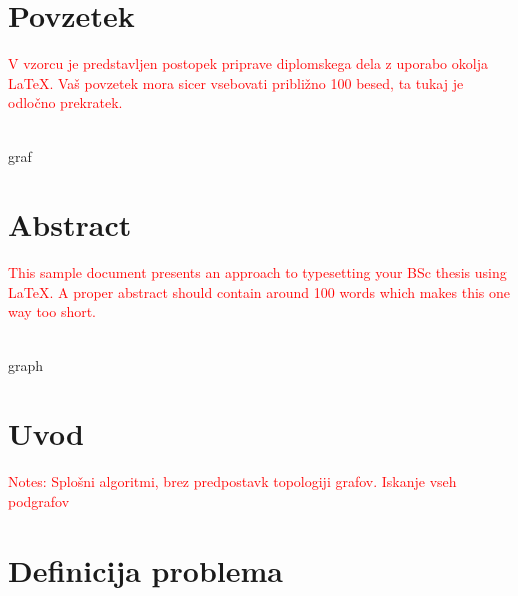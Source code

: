 \documentclass[a4paper, 12pt, ]{book}
\newcommand{\TODO}[1]{\textcolor{red}{#1}}
\newcommand{\clearemptydoublepage}{\newpage{\pagestyle{empty}\cleardoublepage}}
\begin{document}
	
	
	
	\chapter*{Povzetek}
	\TODO{V vzorcu je predstavljen postopek priprave diplomskega dela z uporabo okolja \LaTeX.
	Vaš povzetek mora sicer vsebovati približno 100 besed, ta tukaj je odločno prekratek.}
	
	\vspace{2cm}
	\\
	graf
	
	
	\clearemptydoublepage
	
	
	
	
	
	\chapter*{Abstract}
	\TODO{This sample document presents an approach to typesetting your BSc thesis using \LaTeX. A 
	proper abstract should contain around 100 words which makes this one way too short.}
	
	\vspace{2cm}
	\\
	graph
	
	\clearemptydoublepage




\mainmatter
\setcounter{page}{1}
\pagestyle{fancy}



\chapter{Uvod}
\TODO{Notes: Splošni algoritmi, brez predpostavk topologiji grafov. Iskanje vseh podgrafov}




\chapter{Definicija problema}
\end{document}
